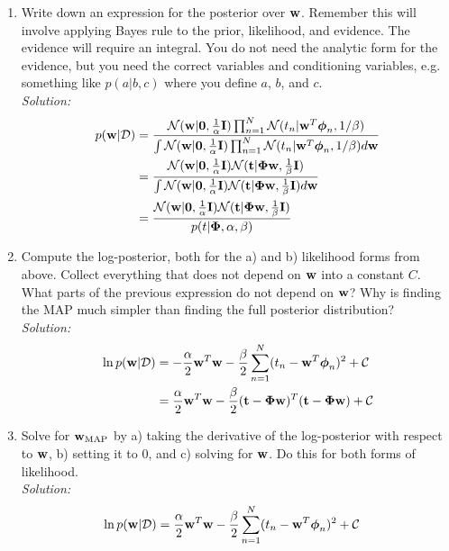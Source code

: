 \documentclass[12pt,a4paper]{article}
\newcommand{\Data}{\mathcal{D}}
\newcommand{\DataIndex}{n}
\newcommand{\eye}{{\bf I}}
\newcommand{\tscalar}{t}
\newcommand{\tvec}{{\bf \tscalar}}
\newcommand{\wscalar}{w}
\newcommand{\wvec}{{\bf \wscalar}}
\newcommand{\wvecMAP}{\wvec_{\text{MAP}}}
\newcommand{\tn}{\tscalar_{\DataIndex}}
\newcommand{\zerovec}{ {\bf 0}}
\newcommand{\phivec}{\boldsymbol{\phi}}
\newcommand{\Phimat}{\boldsymbol{\Phi}}
\newcommand{\phivecn}{\phivec_{\DataIndex}}
\begin{document}
\begin{enumerate}
  \item Write down an expression for the posterior over $\wvec$.  Remember this will involve applying Bayes rule to the prior, likelihood, and evidence.  The evidence will require an integral.  You do not need the analytic form for the evidence, but you need the correct variables and conditioning variables, e.g. something like $p(a|b,c)$ where you define $a$, $b$, and $c$.\\
	  \emph{Solution:} \\
		  \begin{align*}
		  p(\wvec | \Data) &= \frac{\mathcal{N}(\wvec | \zerovec, \frac{1}{\alpha} \eye) \prod_{n=1}^{N} \mathcal{N}(\tn| \wvec^T \phivecn, 1 / \beta)}{\int \mathcal{N}(\wvec | \zerovec, \frac{1}{\alpha} \eye) \prod_{n=1}^{N} \mathcal{N}(\tn| \wvec^T \phivecn, 1 / \beta) d\wvec} \\
		  &= \frac{\mathcal{N}(\wvec | \zerovec, \frac{1}{\alpha} \eye) \mathcal{N} (\tvec | \Phimat \wvec, \frac{1}{\beta} \eye)}{\int {\mathcal{N}(\wvec | \zerovec, \frac{1}{\alpha} \eye) \mathcal{N} (\tvec | \Phimat \wvec, \frac{1}{\beta} \eye) d\wvec}} \\
		  &= \frac{\mathcal{N}(\wvec | \zerovec, \frac{1}{\alpha} \eye) \mathcal{N} (\tvec | \Phimat \wvec, \frac{1}{\beta} \eye)}{p(t | \Phimat, \alpha, \beta)}
		  \end{align*}
  
  \item Compute the log-posterior, both for the a) and b) likelihood forms from above.  Collect everything that does not depend on $\wvec$ into a constant $C$.  What parts of the previous expression do not depend on $\wvec$?  Why is finding the MAP much simpler than finding the full posterior distribution? \\
	  \emph{Solution:} \\
		  \begin{align*}
		  \ln p(\wvec | \Data) &= - \frac{\alpha}{2} \wvec^T \wvec - \frac{\beta}{2} \sum_{n=1}^{N}(\tn - \wvec^T \phivecn)^{2} + \mathcal{C} \\
		  &= \frac{\alpha}{2} \wvec^T \wvec - \frac{\beta}{2} (\tvec - \Phimat \wvec)^{T} (\tvec - \Phimat \wvec) + \mathcal{C}
		  \end{align*}
  
  \item Solve for $\wvecMAP$ by a) taking the derivative of the log-posterior with respect to $\wvec$, b) setting it to 0, and c) solving for $\wvec$.  Do this for both forms of likelihood.\\
	  \emph{Solution:} \\
		  \begin{align*}
		  \ln p(\wvec | \Data) &= \frac{\alpha}{2} \wvec^T \wvec - \frac{\beta}{2} \sum_{n=1}^{N}(\tn- \wvec^T \phivecn)^{2} + \mathcal{C}
		  \end{align*}
		  

\end{enumerate}
\end{document}
